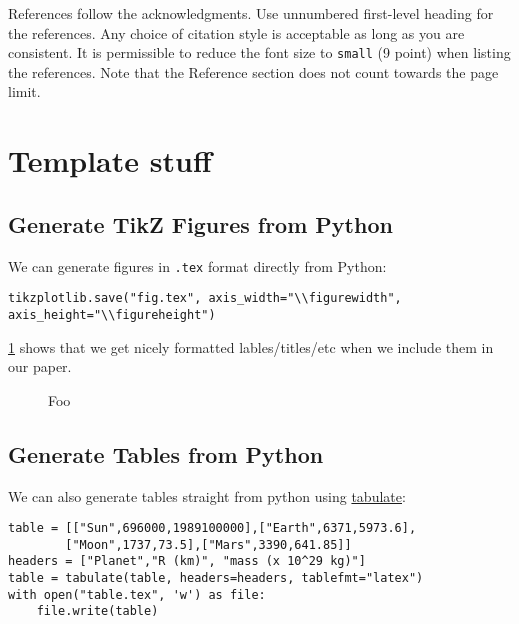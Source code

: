\documentclass{article}
\newlength{\figurewidth}
\newlength{\figureheight}
\begin{document}
References follow the acknowledgments. Use unnumbered first-level heading for
the references. Any choice of citation style is acceptable as long as you are
consistent. It is permissible to reduce the font size to \verb+small+ (9 point)
when listing the references.
Note that the Reference section does not count towards the page limit.
\medskip



\section{Template stuff}
\subsection{Generate TikZ Figures from Python}
We can generate figures in \texttt{.tex} format directly from Python:
\begin{verbatim}
tikzplotlib.save("fig.tex", axis_width="\\figurewidth", axis_height="\\figureheight")
\end{verbatim}
\cref{fig:example} shows that we get nicely formatted lables/titles/etc when we include them in our paper.
\begin{figure}[h]
    \centering\footnotesize

    \setlength{\figurewidth}{.33\textwidth}
    \setlength{\figureheight}{.75\figurewidth}


    \begin{subfigure}{.4\textwidth}
        \centering
        
    \end{subfigure}
    \hfill
    \begin{subfigure}{.4\textwidth}
        \centering
        
    \end{subfigure}
    \caption{Foo}
    \label{fig:example}
\end{figure}

\subsection{Generate Tables from Python}
We can also generate tables straight from python using \href{https://github.com/astanin/python-tabulate}{tabulate}:
\begin{verbatim}
table = [["Sun",696000,1989100000],["Earth",6371,5973.6],
        ["Moon",1737,73.5],["Mars",3390,641.85]]
headers = ["Planet","R (km)", "mass (x 10^29 kg)"]
table = tabulate(table, headers=headers, tablefmt="latex")
with open("table.tex", 'w') as file:
    file.write(table)
\end{verbatim}
\end{document}
